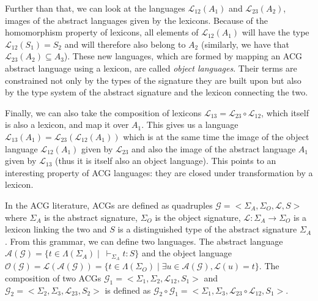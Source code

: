 Further than that, we can look at the languages $\mathcal{L}_{12}(A_1)$
and $\mathcal{L}_{23}(A_2)$, images of the abstract languages given by
the lexicons. Because of the homomorphism property of lexicons, all
elements of $\mathcal{L}_{12}(A_1)$ will have the type
$\mathcal{L}_{12}(S_1) = S_2$ and will therefore also belong to $A_2$
(similarly, we have that $\mathcal{L}_{23}(A_2) \subseteq A_3$). These
new languages, which are formed by mapping an ACG abstract language
using a lexicon, are called \emph{object languages}. Their terms are
constrained not only by the types of the signature they are built upon
but also by the type system of the abstract signature and the lexicon
connecting the two.

Finally, we can also take the composition of lexicons $\mathcal{L}_{13}
= \mathcal{L}_{23} \circ \mathcal{L}_{12}$, which itself is also a
lexicon, and map it over $A_1$. This gives us a language
$\mathcal{L}_{13}(A_1) = \mathcal{L}_{23}(\mathcal{L}_{12}(A_1))$ which
is at the same time the image of the object language
$\mathcal{L}_{12}(A_1)$ given by $\mathcal{L}_{23}$ and also the image
of the abstract language $A_1$ given by $\mathcal{L}_{13}$ (thus it is
itself also an object language). This points to an interesting property
of ACG languages: they are closed under transformation by a lexicon.

In the ACG literature, ACGs are defined as quadruples $\mathcal{G} =
\mathopen{<}\Sigma_A, \Sigma_O, \mathcal{L}, S\mathclose{>}$ where
$\Sigma_A$ is the abstract signature, $\Sigma_O$ is the object
signature, $\mathcal{L} : \Sigma_A \to \Sigma_O$ is a lexicon linking
the two and $S$ is a distinguished type of the abstract signature
$\Sigma_A$. From this grammar, we can define two languages. The abstract
language $\mathcal{A}(\mathcal{G}) = \{t \in \Lambda(\Sigma_A) \mid
\ \vdash_{\Sigma_A} t : S\}$ and the object language
$\mathcal{O}(\mathcal{G}) = \mathcal{L}(\mathcal{A}(\mathcal{G})) = \{t
\in \Lambda(\Sigma_O) \mid \exists u \in \mathcal{A}(\mathcal{G}),
\mathcal{L}(u) = t\}$. The composition of two ACGs $\mathcal{G}_1 =
\mathopen{<}\Sigma_1, \Sigma_2, \mathcal{L}_{12}, S_1\mathclose{>}$ and
$\mathcal{G}_2 = \mathopen{<}\Sigma_2, \Sigma_3, \mathcal{L}_{23},
S_2\mathclose{>}$ is defined as $\mathcal{G}_2 \circ \mathcal{G}_1 =
\mathopen{<}\Sigma_1, \Sigma_3, \mathcal{L}_{23} \circ \mathcal{L}_{12},
S_1\mathclose{>}$.

